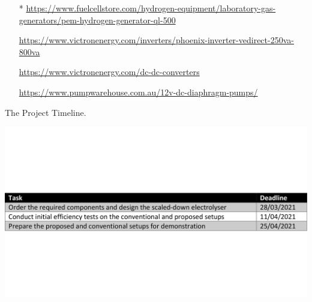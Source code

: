 \documentclass[1pt]{extarticle}
\begin{document}
\begin{itemize}
    \item [*] \href{https://www.fuelcellstore.com/hydrogen-equipment/laboratory-gas-generators/pem-hydrogen-generator-ql-500}{https://www.fuelcellstore.com/hydrogen-equipment/laboratory-gas-generators/pem-hydrogen-generator-ql-500}
    \item [\dagger] \href{https://www.victronenergy.com/inverters/phoenix-inverter-vedirect-250va-800va}{https://www.victronenergy.com/inverters/phoenix-inverter-vedirect-250va-800va}
    \item [\ddagger] \href{https://www.victronenergy.com/dc-dc-converters}{https://www.victronenergy.com/dc-dc-converters}
    \item [\bullet] \href{https://www.pumpwarehouse.com.au/12v-dc-diaphragm-pumps/}{https://www.pumpwarehouse.com.au/12v-dc-diaphragm-pumps/}
\end{itemize}

    \begin{table}[h!]
        \centering
        \caption{The Project Timeline.}
        \vspace{-2.5mm}
        \label{TBL3}
            \includegraphics[clip,trim= 0cm 7cm 0cm 7cm,width=1\linewidth]{images/TBL3.pdf}
        \vspace{-6mm}
    \end{table}

\pagebreak



\end{document}
